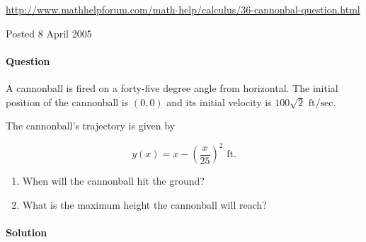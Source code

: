 \url{http://www.mathhelpforum.com/math-help/calculus/36-cannonbal-question.html}

Posted 8 April 2005

\paragraph{Question} A cannonball is fired on a forty-five degree angle from horizontal. The initial position of the cannonball is $\left(0,0\right)$ and its initial velocity is $100\sqrt{2}\mbox{ ft/sec.}$

The cannonball's trajectory is given by

\[y\left(x\right)=x-\left(\frac{x}{25}\right)^2\mbox{ ft.}\]

\begin{enumerate}
	\item
		When will the cannonball hit the ground?
	\item
		What is the maximum height the cannonball will reach?
\end{enumerate}

\paragraph{Solution}



